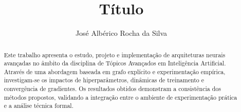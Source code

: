 \documentclass[runningheads]{llncs}
\begin{document}
\title{Título}

\author{José Albérico Rocha da Silva}


\maketitle

\begin{abstract}
Este trabalho apresenta o estudo, projeto e implementação de arquiteturas neurais avançadas no âmbito da disciplina de Tópicos Avançados em Inteligência Artificial. Através de uma abordagem baseada em grafo explícito e experimentação empírica, investigam-se os impactos de hiperparâmetros, dinâmicas de treinamento e convergência de gradientes. Os resultados obtidos demonstram a consistência dos métodos propostos, validando a integração entre o ambiente de experimentação prática e a análise técnica formal.

\end{abstract}









\end{document}
